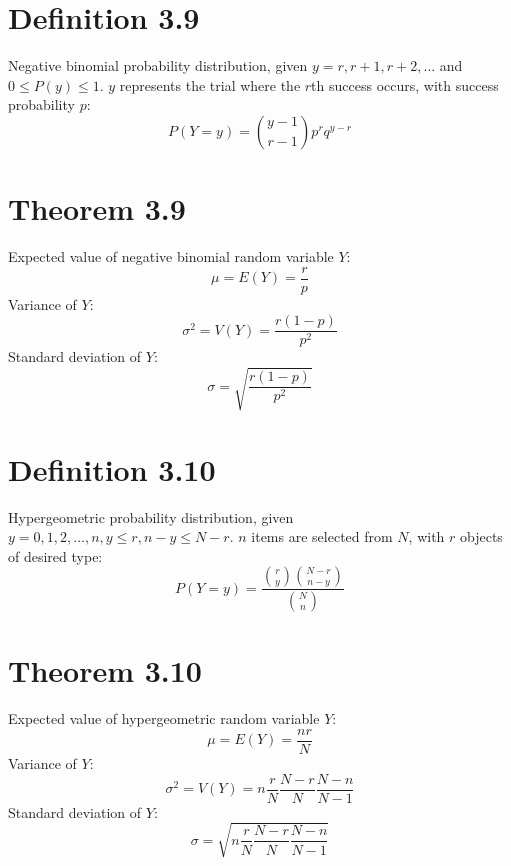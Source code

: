 \documentclass[12pt]{article}
\begin{document}
\section{Definition 3.9}
Negative binomial probability distribution, given $y = r, r+1, r+2, \ldots$ and $0 \leq P(y) \leq 1$. $y$ represents the trial where the $r$th success occurs, with success probability $p$:
\[
P(Y = y) = \binom{y-1}{r-1} p^r q^{y-r}
\]

\section{Theorem 3.9}
Expected value of negative binomial random variable $Y$:
\[
\mu = E(Y) = \frac{r}{p}
\]
Variance of $Y$:
\[
\sigma^2 = V(Y) = \frac{r(1-p)}{p^2}
\]
Standard deviation of $Y$:
\[
\sigma = \sqrt{\frac{r(1-p)}{p^2}}
\]

\section{Definition 3.10}
Hypergeometric probability distribution, given $y = 0, 1, 2, \ldots, n, y \leq r, n-y \leq N-r$. $n$ items are selected from $N$, with $r$ objects of desired type:
\[
P(Y = y) = \frac{\binom{r}{y}\binom{N-r}{n-y}}{\binom{N}{n}}
\]

\section{Theorem 3.10}
Expected value of hypergeometric random variable $Y$:
\[
\mu = E(Y) = \frac{nr}{N}
\]
Variance of $Y$:
\[
\sigma^2 = V(Y) = n \frac{r}{N}\frac{N-r}{N}\frac{N-n}{N-1}
\]
Standard deviation of $Y$:
\[
\sigma = \sqrt{n \frac{r}{N}\frac{N-r}{N}\frac{N-n}{N-1}}
\]
\end{document}

